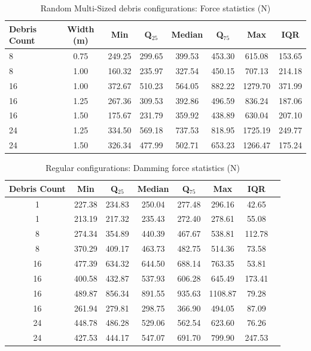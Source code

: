 \documentclass{article}
\begin{document}
\begin{table}[h!]
\centering
\caption{Random Multi-Sized debris configurations: Force statistics (N)}
\begin{tabular}{lccccccc}
\toprule
\textbf{Debris Count} & \textbf{Width (m)} & \textbf{Min} & \textbf{Q$_{25}$} & \textbf{Median} & \textbf{Q$_{75}$} & \textbf{Max} & \textbf{IQR} \\
\midrule
8 & 0.75 & 249.25 & 299.65 & 399.53 & 453.30 & 615.08 & 153.65 \\
8 & 1.00 & 160.32 & 235.97 & 327.54 & 450.15 & 707.13 & 214.18 \\
16 & 1.00 & 372.67 & 510.23 & 564.05 & 882.22 & 1279.70 & 371.99 \\
16 & 1.25 & 267.36 & 309.53 & 392.86 & 496.59 & 836.24 & 187.06 \\
16 & 1.50 & 175.67 & 231.79 & 359.92 & 438.89 & 630.04 & 207.10 \\
24 & 1.25 & 334.50 & 569.18 & 737.53 & 818.95 & 1725.19 & 249.77 \\
24 & 1.50 & 326.34 & 477.99 & 502.71 & 653.23 & 1266.47 & 175.24 \\
\bottomrule
\end{tabular}
\end{table}


\begin{table}[h!]
\centering
\caption{Regular configurations: Damming force statistics (N)}
\begin{tabular}{cccccccc}
\toprule
\textbf{Debris Count} & \textbf{Min} & \textbf{Q$_{25}$} & \textbf{Median} & \textbf{Q$_{75}$} & \textbf{Max} & \textbf{IQR} \\
\midrule
1 & 227.38 & 234.83 & 250.04 & 277.48 & 296.16 & 42.65 \\
1 & 213.19 & 217.32 & 235.43 & 272.40 & 278.61 & 55.08 \\
8 & 274.34 & 354.89 & 440.39 & 467.67 & 538.81 & 112.78 \\
8 & 370.29 & 409.17 & 463.73 & 482.75 & 514.36 & 73.58 \\
16 & 477.39 & 634.32 & 644.50 & 688.14 & 763.35 & 53.81 \\
16 & 400.58 & 432.87 & 537.93 & 606.28 & 645.49 & 173.41 \\
16 & 489.87 & 856.34 & 891.55 & 935.63 & 1108.87 & 79.28 \\
16 & 261.94 & 279.81 & 298.75 & 366.90 & 494.05 & 87.09 \\
24 & 448.78 & 486.28 & 529.06 & 562.54 & 623.60 & 76.26 \\
24 & 427.53 & 444.17 & 547.07 & 691.70 & 799.90 & 247.53 \\
\bottomrule
\end{tabular}
\end{table}
\end{document}

